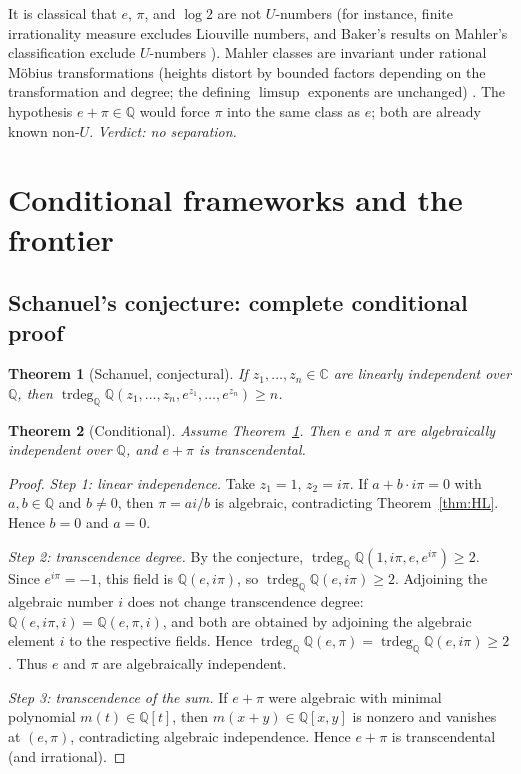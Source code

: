 \documentclass[11pt]{amsart}
\newtheorem{theorem}{Theorem}[section]
\theoremstyle{definition}
\theoremstyle{remark}
\numberwithin{equation}{section}
\newcommand{\Q}{\mathbb{Q}}
\newcommand{\C}{\mathbb{C}}
\newcommand{\trdeg}{\operatorname{trdeg}}
\newcommand{\ee}{e}
\begin{document}
It is classical that $\ee$, $\pi$, and $\log2$ are not $U$-numbers (for instance, finite irrationality measure excludes Liouville numbers, and Baker's results on Mahler's classification exclude $U$-numbers \cite{Baker}). Mahler classes are invariant under rational M\"obius transformations (heights distort by bounded factors depending on the transformation and degree; the defining $\limsup$ exponents are unchanged) \cite{Baker,HuberWustholz2022}. The hypothesis $e+\pi\in\Q$ would force $\pi$ into the same class as $\ee$; both are already known non-$U$. \emph{Verdict: no separation.}

\section{Conditional frameworks and the frontier}\label{sec:conditional}

\subsection{Schanuel's conjecture: complete conditional proof}

\begin{theorem}[Schanuel, conjectural]\label{thm:schanuel}
If $z_1,\dots,z_n\in\C$ are linearly independent over $\Q$, then $\trdeg_\Q\Q(z_1,\dots,z_n,\ee^{z_1},\dots,\ee^{z_n})\ge n$.
\end{theorem}

\begin{theorem}[Conditional]\label{thm:schanuel-consequence}
Assume Theorem~\ref{thm:schanuel}. Then $\ee$ and $\pi$ are algebraically independent over $\Q$, and $e+\pi$ is transcendental.
\end{theorem}

\begin{proof}
\emph{Step 1: linear independence.} Take $z_1=1$, $z_2=i\pi$. If $a+b\cdot i\pi=0$ with $a,b\in\Q$ and $b\ne0$, then $\pi=ai/b$ is algebraic, contradicting Theorem~\ref{thm:HL}. Hence $b=0$ and $a=0$.

\emph{Step 2: transcendence degree.} By the conjecture, $\trdeg_\Q\Q(1,i\pi,\ee,\ee^{i\pi})\ge2$. Since $\ee^{i\pi}=-1$, this field is $\Q(\ee,i\pi)$, so $\trdeg_\Q\Q(\ee,i\pi)\ge2$. Adjoining the algebraic number $i$ does not change transcendence degree: $\Q(\ee,i\pi,i)=\Q(\ee,\pi,i)$, and both are obtained by adjoining the algebraic element $i$ to the respective fields. Hence $\trdeg_\Q\Q(\ee,\pi)=\trdeg_\Q\Q(\ee,i\pi)\ge2$. Thus $\ee$ and $\pi$ are algebraically independent.

\emph{Step 3: transcendence of the sum.} If $e+\pi$ were algebraic with minimal polynomial $m(t)\in\Q[t]$, then $m(x+y)\in\Q[x,y]$ is nonzero and vanishes at $(\ee,\pi)$, contradicting algebraic independence. Hence $e+\pi$ is transcendental (and irrational).
\end{proof}
\end{document}
